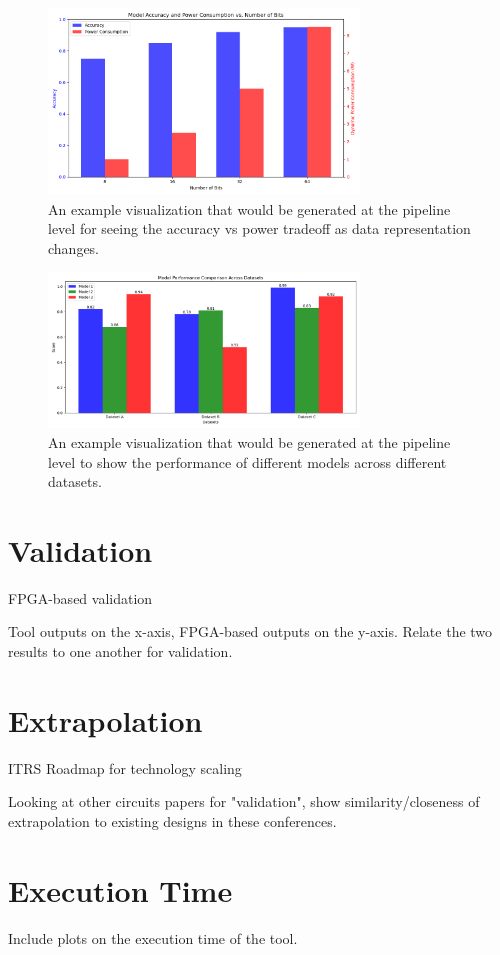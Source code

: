 \documentclass[twocolumn]{article}
\begin{document}
\begin{figure}[htp]
    \centering
    \includegraphics[width=8.25cm]{vis/Pipeline_vis.png}
    \caption{An example visualization that would be generated at the pipeline level for seeing the accuracy vs power tradeoff as data representation changes.}
    \label{fig:comp_graph}
\end{figure}

\begin{figure}[htp]
    \centering
    \includegraphics[width=8.25cm]{vis/Pipeline_perf.png}
    \caption{An example visualization that would be generated at the pipeline level to show the performance of different models across different datasets.}
    \label{fig:comp_graph}
\end{figure}

\section{Validation}
FPGA-based validation

Tool outputs on the x-axis, FPGA-based outputs on the y-axis. Relate the two results to one another for validation.

\section{Extrapolation}
ITRS Roadmap for technology scaling

Looking at other circuits papers for "validation", show similarity/closeness of extrapolation to existing designs in these conferences.

\section{Execution Time}
Include plots on the execution time of the tool.
\end{document}
